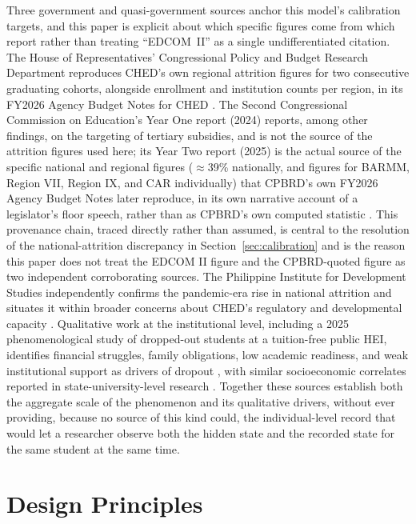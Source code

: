\documentclass[11pt]{article}
\begin{document}
Three government and quasi-government sources anchor this model's calibration targets, and this paper is explicit about which specific figures come from which report rather than treating ``EDCOM~II'' as a single undifferentiated citation. The House of Representatives' Congressional Policy and Budget Research Department reproduces CHED's own regional attrition figures for two consecutive graduating cohorts, alongside enrollment and institution counts per region, in its FY2026 Agency Budget Notes for CHED \citep{cpbrd2026}. The Second Congressional Commission on Education's Year One report (2024) reports, among other findings, on the targeting of tertiary subsidies, and is not the source of the attrition figures used here; its Year Two report (2025) is the actual source of the specific national and regional figures ($\approx$39\% nationally, and figures for BARMM, Region VII, Region IX, and CAR individually) that CPBRD's own FY2026 Agency Budget Notes later reproduce, in its own narrative account of a legislator's floor speech, rather than as CPBRD's own computed statistic \citep{edcom2024,edcom2025y2}. This provenance chain, traced directly rather than assumed, is central to the resolution of the national-attrition discrepancy in Section~\ref{sec:calibration} and is the reason this paper does not treat the EDCOM II figure and the CPBRD-quoted figure as two independent corroborating sources. The Philippine Institute for Development Studies independently confirms the pandemic-era rise in national attrition and situates it within broader concerns about CHED's regulatory and developmental capacity \citep{pids2024}. Qualitative work at the institutional level, including a 2025 phenomenological study of dropped-out students at a tuition-free public HEI, identifies financial struggles, family obligations, low academic readiness, and weak institutional support as drivers of dropout \citep{cahilog2025}, with similar socioeconomic correlates reported in state-university-level research \citep{socioeconomic2024}. Together these sources establish both the aggregate scale of the phenomenon and its qualitative drivers, without ever providing, because no source of this kind could, the individual-level record that would let a researcher observe both the hidden state and the recorded state for the same student at the same time.


\FloatBarrier
\section{Design Principles}
\label{sec:principles}
\end{document}
